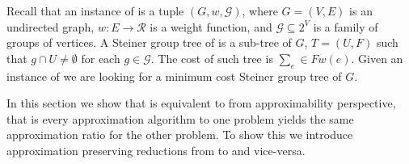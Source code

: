Recall that an instance of \ProbGroup{} is a tuple $(G, w, \mathcal{G})$,
where $G = (V, E)$ is an undirected graph, $w:E \to \mathcal{R}$ is a weight function, 
and $\mathcal{G} \subseteq 2^V$ is a family of groups of vertices.
A Steiner group tree of is a sub-tree of $G$, $T = (U, F)$
such that $g \cap U \neq \emptyset$ for each $g \in \mathcal{G}$.
The cost of such tree is $\sum_e \in F w(e)$.
Given an instance of \ProbGroup{} we are looking for a minimum cost Steiner group tree
of $G$.

In this section we show that \Prob{} is equivalent to \ProbGroup{} from 
approximability perspective, 
that is every approximation algorithm to one problem yields the same approximation 
ratio for the other problem.
To show this we introduce approximation preserving reductions from \Prob{} to \ProbGroup{}
and vice-versa. 

